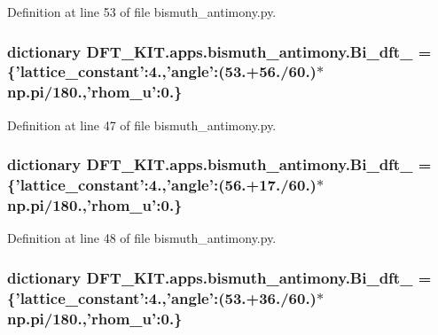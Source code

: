 Definition at line 53 of file bismuth\+\_\+antimony.\+py.

\hypertarget{namespace_d_f_t___k_i_t_1_1apps_1_1bismuth__antimony_ad3ff489e1051aa82103c3da7dc7b6b5f}{
\subsubsection[{Bi\+\_\+dft\+\_\+1}]{\setlength{\rightskip}{0pt plus 5cm}dictionary D\+F\+T\+\_\+\+K\+I\+T.\+apps.\+bismuth\+\_\+antimony.\+Bi\+\_\+dft\+\_ = \{'lattice\+\_\+constant'\+:4.,'angle'\+:(53.+56./60.)$\ast$np.\+pi/180.,'rhom\+\_\+u'\+:0.\}}}\label{namespace_d_f_t___k_i_t_1_1apps_1_1bismuth__antimony_ad3ff489e1051aa82103c3da7dc7b6b5f}


Definition at line 47 of file bismuth\+\_\+antimony.\+py.

\hypertarget{namespace_d_f_t___k_i_t_1_1apps_1_1bismuth__antimony_af07069b59f7b4092160fafe6e87f7dc1}{
\subsubsection[{Bi\+\_\+dft\+\_\+2}]{\setlength{\rightskip}{0pt plus 5cm}dictionary D\+F\+T\+\_\+\+K\+I\+T.\+apps.\+bismuth\+\_\+antimony.\+Bi\+\_\+dft\+\_ = \{'lattice\+\_\+constant'\+:4.,'angle'\+:(56.+17./60.)$\ast$np.\+pi/180.,'rhom\+\_\+u'\+:0.\}}}\label{namespace_d_f_t___k_i_t_1_1apps_1_1bismuth__antimony_af07069b59f7b4092160fafe6e87f7dc1}


Definition at line 48 of file bismuth\+\_\+antimony.\+py.

\hypertarget{namespace_d_f_t___k_i_t_1_1apps_1_1bismuth__antimony_a985fb7de2187991f21de822473d66fc5}{
\subsubsection[{Bi\+\_\+dft\+\_\+3}]{\setlength{\rightskip}{0pt plus 5cm}dictionary D\+F\+T\+\_\+\+K\+I\+T.\+apps.\+bismuth\+\_\+antimony.\+Bi\+\_\+dft\+\_ = \{'lattice\+\_\+constant'\+:4.,'angle'\+:(53.+36./60.)$\ast$np.\+pi/180.,'rhom\+\_\+u'\+:0.\}}}\label{namespace_d_f_t___k_i_t_1_1apps_1_1bismuth__antimony_a985fb7de2187991f21de822473d66fc5}


